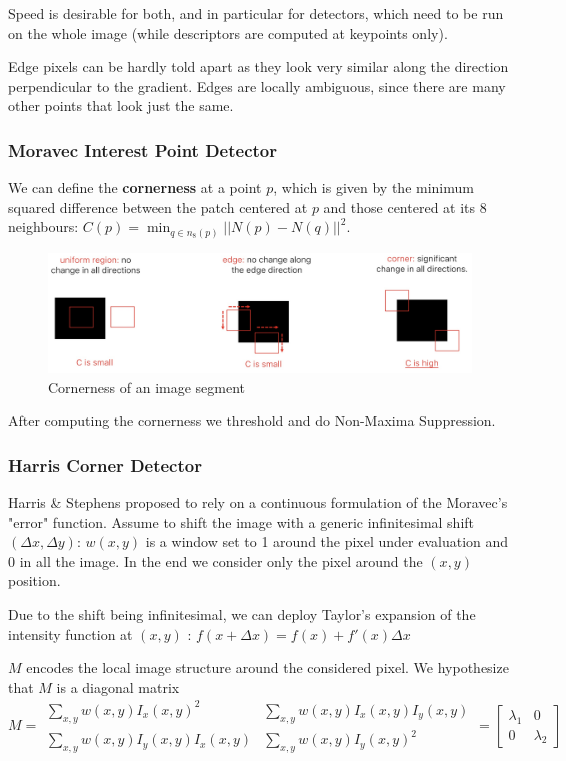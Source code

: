 \documentclass{article}
\begin{document}
Speed is desirable for both, and in particular for detectors, which need to be run on the whole image (while descriptors are computed at keypoints only).

Edge pixels can be hardly told apart as they look very similar along the direction perpendicular to the gradient.
Edges are locally ambiguous, since there are many other points that look just the same.

\subsubsection{Moravec Interest Point Detector}
We can define the \textbf{cornerness} at a point $p$, which is given by the minimum squared difference between the patch centered at $p$ and those centered at its 8 neighbours: $C(p) = \min_{q \in n_8(p)} ||N(p) - N(q)||^2$.

\begin{figure}[htbp]
  \centering
  \includegraphics[width=0.7\linewidth]{./img/cornerness.jpg}
  \caption{Cornerness of an image segment}
  \label{fig:cornerness}
\end{figure}

After computing the cornerness we threshold and do Non-Maxima Suppression.

\subsubsection{Harris Corner Detector}

Harris \& Stephens proposed to rely on a continuous formulation of the Moravec's "error" function.
Assume to shift the image with a generic infinitesimal shift $(\Delta x, \Delta y)$:
$w(x,y)$ is a window set to 1 around the pixel under evaluation and 0 in all the image.
In the end we consider only the pixel around the $(x,y)$ position.

Due to the shift being infinitesimal, we can deploy Taylor's expansion of the intensity function at $(x,y)$ : $f(x + \Delta x) = f(x) + f'(x) \Delta x$

$M$ encodes the local image structure around the considered pixel.
We hypothesize that $M$ is a diagonal matrix
$M =
\begin{matrix}
\sum_{x,y} w(x,y) I_x(x,y)^2 & \sum_{x,y} w(x,y) I_x(x,y) I_y(x,y) \\
\sum_{x,y} w(x,y) I_y(x,y) I_x(x,y) & \sum_{x,y} w(x,y) I_y(x,y)^2
\end{matrix}
=
\begin{bmatrix}
\lambda_1 & 0 \\
0 & \lambda_2
\end{bmatrix}$
\end{document}
